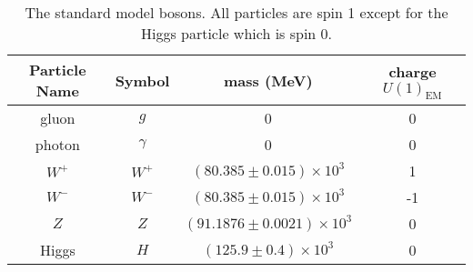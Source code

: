 \begin{table}
  \centering
  \begin{tabular}{c c c c}
    Particle Name & Symbol    & mass (MeV)                      & charge $U(1)_{\mbox{EM}}$ \\
    \hline
    gluon         & $g$       & 0                               &  0                        \\
    photon        & $\gamma$  & 0                               &  0                        \\
    $W^+$         & $W^+$     & $(80.385\pm0.015)\times10^3$    &  1                        \\
    $W^-$         & $W^-$     & $(80.385\pm0.015)\times10^3$    & -1                        \\
    $Z$           & $Z$       & $(91.1876\pm0.0021)\times10^3$  &  0                        \\
    Higgs         & $H$       & $(125.9\pm0.4)\times10^3$       &  0
  \end{tabular}
  \label{table:bosons}
  \caption{The standard model bosons.  All particles are spin 1 except for the Higgs particle which is spin 0.}
\end{table}

